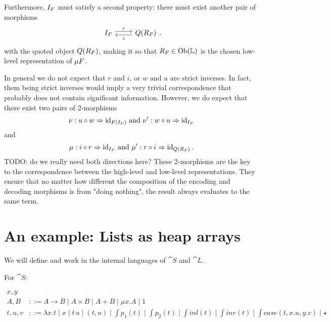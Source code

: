Furthermore, $I_{ F}$ must satisfy a second property: there must exist
another pair of morphisms
\begin{equation}
  \begin{tikzcd}
    I_{\fun F} \arrow[r, "r", shift left] & \fun Q(R_{\fun F}) \arrow[l, "i", shift left]
  \end{tikzcd}.
\end{equation}
with the quoted object $ Q(R_{ F})$, making it so that $R_{ F} \in \mathrm{Ob}(\mathbb L)$ is the chosen low-level
representation of $\mu  F$.

In general we do not expect that $r$ and $i$, or $w$ and $u$ are strict
inverses. In fact, them being strict inverses would imply a very trivial
correspondence that probably does not contain significant information. However,
we do expect that there exist two pairs of 2-morphisms
\begin{equation}
  \nu : u \circ w \Rightarrow \mathrm{id}_{ F(I_{ F})} \text{ and } \nu' : w \circ u \Rightarrow \mathrm{id}_{I_{ F}}
\end{equation}
and
\begin{equation}
  \mu : i \circ r \Rightarrow \mathrm{id}_{I_{ F}} \text{ and } \mu' : r \circ i \Rightarrow \mathrm{id}_{ Q(R_{ F})} \,.
\end{equation}
TODO: do we really need both directions here?
These 2-morphisms are the key to the correspondence between the high-level and
low-level representations. They ensure that no matter how different the composition of the
encoding and decoding morphisms is from "doing nothing", the result always evaluates to the same term.


\section{An example: Lists as heap arrays}

We will define and work in the internal languages of $\cat S$ and $\cat L$.

For $\cat S$:

\begin{align}
  x,y  \tag{variables}                                                                                                                                                                 \\
  A, B    & ::=  A \to B \mid A \times B \mid A + B \mid \mu x . A \mid 1 \tag{types}                                                                                                  \\
  t, u, v & ::= \lambda x . t \mid x \mid t\,u \mid (t, u) \mid \int{p}_1(t) \mid \int{p}_2(t) \mid \int{inl}(t) \mid \int{inr}(t) \mid \int{case}(t, x.u, y.v) \mid \star \tag{terms}
\end{align}

